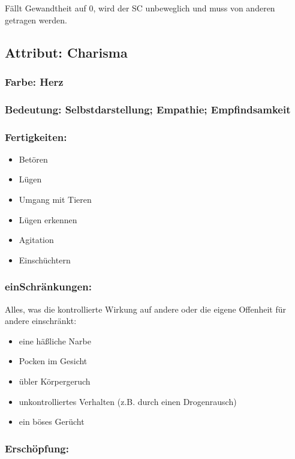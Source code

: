 Fällt Gewandtheit auf 0, wird der SC unbeweglich und muss von anderen getragen werden.

\subsection{Attribut: Charisma}

\subsubsection{Farbe: Herz}

\subsubsection{Bedeutung: Selbstdarstellung; Empathie; Empfindsamkeit}

\subsubsection{Fertigkeiten:}
\begin{itemize}
\item Betören
\item Lügen
\item Umgang mit Tieren
\item Lügen erkennen
\item Agitation
\item Einschüchtern
\end{itemize}

\subsubsection{einSchränkungen:}

Alles, was die kontrollierte Wirkung auf andere oder die eigene Offenheit für andere einschränkt:
\begin{itemize}
\item eine häßliche Narbe
\item Pocken im Gesicht
\item übler Körpergeruch
\item unkontrolliertes Verhalten (z.B. durch einen Drogenrausch)
\item ein böses Gerücht
\end{itemize}

\subsubsection{Erschöpfung:}

